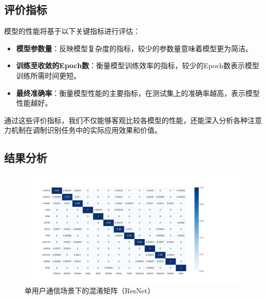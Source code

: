 \subsection{评价指标}

模型的性能将基于以下关键指标进行评估：

\begin{itemize}
    \item \textbf{模型参数量}：反映模型复杂度的指标，较少的参数量意味着模型更为简洁。
    \item \textbf{训练至收敛的Epoch数}：衡量模型训练效率的指标，较少的Epoch数表示模型训练所需时间更短。
    \item \textbf{最终准确率}：衡量模型性能的主要指标，在测试集上的准确率越高，表示模型性能越好。
\end{itemize}

通过这些评价指标，我们不仅能够客观比较各模型的性能，还能深入分析各种注意力机制在调制识别任务中的实际应用效果和价值。


\subsection{结果分析}\label{sec:background}

\begin{figure}
    \centering
    \includegraphics[width=\textwidth]{Image/confusion_matrix.pdf}
    \caption{单用户通信场景下的混淆矩阵（ResNet）}
    \label{fig:basic_result}
\end{figure}

